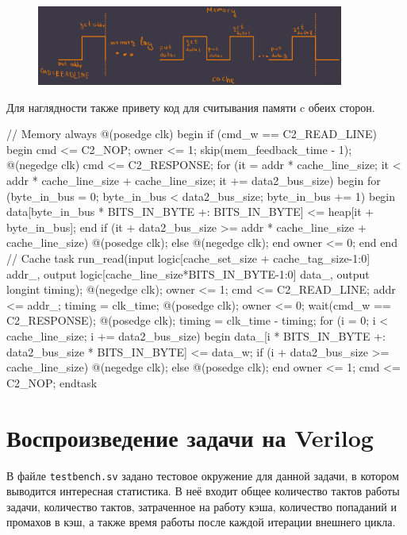 \documentclass[14pt, russian, onesize]{extreport}
\begin{document}
\begin{figure}[H]
    \centering
    \includegraphics[width=0.9\textwidth]{memory_read}
    \caption{}
\end{figure}
Для наглядности также привету код для считывания памяти c обеих сторон.
\begin{svcode}
    // Memory
    always @(posedge clk) begin
        if (cmd_w == C2_READ_LINE) begin
            cmd <= C2_NOP;
            owner <= 1;
            skip(mem_feedback_time - 1);
            @(negedge clk)
            cmd <= C2_RESPONSE;
            for (it = addr * cache_line_size; it < addr * cache_line_size + cache_line_size; it += data2_bus_size) begin
                for (byte_in_bus = 0; byte_in_bus < data2_bus_size; byte_in_bus += 1) begin
                    data[byte_in_bus * BITS_IN_BYTE +: BITS_IN_BYTE] <= heap[it + byte_in_bus];
                end
                if (it + data2_bus_size >= addr * cache_line_size + cache_line_size)
                    @(posedge clk);
                else
                    @(negedge clk);
            end
            owner <= 0;
        end
    end
    // Cache
    task run_read(input logic[cache_set_size + cache_tag_size-1:0] addr_, output logic[cache_line_size*BITS_IN_BYTE-1:0] data_, output longint timing);
        @(negedge clk);
        owner <= 1;
        cmd <= C2_READ_LINE;
        addr <= addr_;
        timing = clk_time;
        @(posedge clk);
        owner <= 0;
        wait(cmd_w == C2_RESPONSE); 
        @(posedge clk);
        timing = clk_time - timing;
        for (i = 0; i < cache_line_size; i += data2_bus_size) begin
            data_[i * BITS_IN_BYTE +: data2_bus_size * BITS_IN_BYTE] <= data_w;
            if (i + data2_bus_size >= cache_line_size)
                @(negedge clk);
            else
                @(posedge clk);
        end
        owner <= 1;
        cmd <= C2_NOP;
    endtask
\end{svcode}

\section*{ Воспроизведение задачи на Verilog }
В файле \texttt{testbench.sv} задано тестовое окружение для данной 
задачи, в котором выводится интересная статистика. В неё
входит общее количество тактов работы задачи, количество
тактов, затраченное на работу кэша, количество попаданий
и промахов в кэш, а также время работы после каждой
итерации внешнего цикла. 
\end{document}
